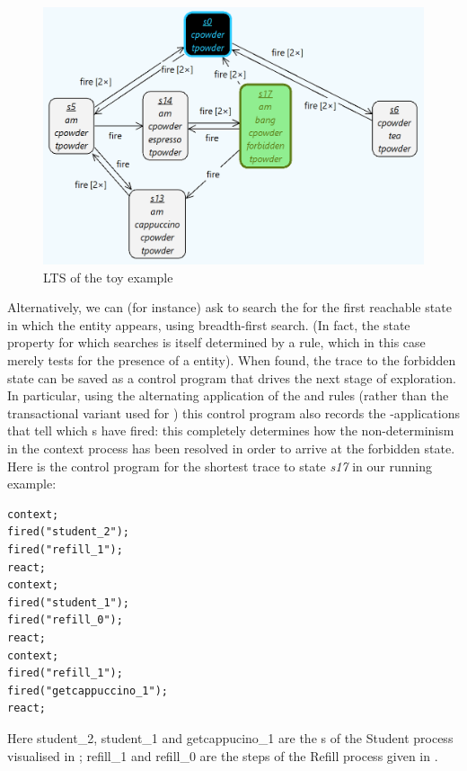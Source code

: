 \begin{figure}
\centering
\includegraphics[scale=.2]{figs/toy-gts}
\caption{\GROOVE LTS of the toy example}
\label{fig:toy-gts}
\end{figure}

Alternatively, we can (for instance) ask \GROOVE to search the for the first reachable state in which the \Forbidden entity appears, using breadth-first search. (In fact, the state property for which \GROOVE searches is itself determined by a rule, which in this case merely tests for the presence of a \Forbidden entity). When found, the trace to the forbidden state can be saved as a control program that drives the next stage of \GROOVE exploration. In particular, using the alternating application of the \contextR and \reactR rules (rather than the transactional variant used for ) this control program also records the \firedR-applications that tell which \Step{}s have fired: this completely determines how the non-determinism in the context process has been resolved in order to arrive at the forbidden state. Here is the control program for the shortest trace to state \textsf{\itshape s17} in our running example:

\begin{center}
\begin{lstlisting}
context;
fired("student_2");
fired("refill_1");
react;
context;
fired("student_1");
fired("refill_0");
react;
context;
fired("refill_1");
fired("getcappuccino_1");
react;
\end{lstlisting}
\end{center}
%
Here \textsf{student\_2}, \textsf{student\_1} and \textsf{getcappucino\_1} are the \Step{}s of the \textsf{Student} process visualised in ; \textsf{refill\_1} and \textsf{refill\_0} are the steps of the \textsf{Refill} process given in .

